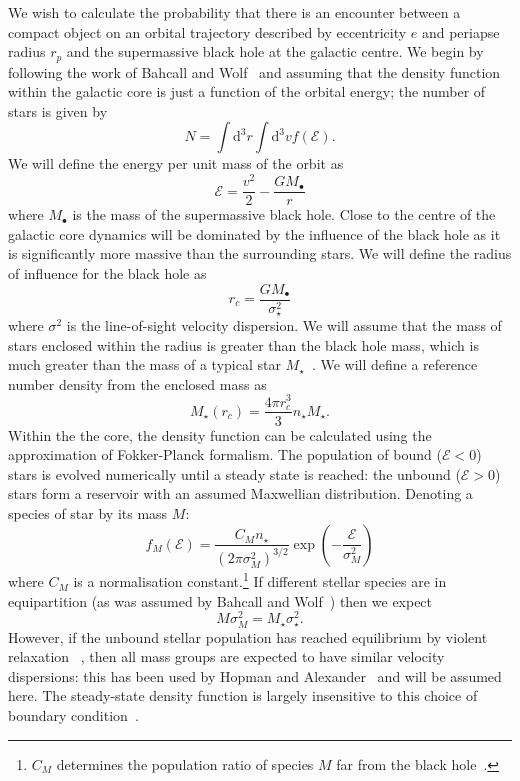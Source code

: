 \documentclass[useAMS,usenatbib]{mn2e}
\newcommand{\dd}{\ensuremath{\mathrm{d}}}
\begin{document}
We wish to calculate the probability that there is an encounter between a compact object on an orbital trajectory described by eccentricity $e$ and periapse radius $r_p$ and the supermassive black hole at the galactic centre. We begin by following the work of Bahcall and Wolf~\cite{Bahcall1976, Bahcall1977} and assuming that the density function within the galactic core is just a function of the orbital energy; the number of stars is given by
\begin{equation}
N = \int \dd^3r \int \dd^3v f(\mathcal{E}).
\end{equation}
We will define the energy per unit mass of the orbit as
\begin{equation}
\mathcal{E} = \frac{v^2}{2} - \frac{GM_\bullet}{r}
\end{equation}
where $M_\bullet$ is the mass of the supermassive black hole. Close to the centre of the galactic core dynamics will be dominated by the influence of the black hole as it is significantly more massive than the surrounding stars. We will define the radius of influence for the black hole as
\begin{equation}
r_c = \frac{GM_\bullet}{\sigma_\star^2}
\end{equation}
where $\sigma^2$ is the line-of-sight velocity dispersion. We will assume that the mass of stars enclosed within the radius is greater than the black hole mass, which is much greater than the mass of a typical star $M_\star$~\cite{Bahcall1976}. We will define a reference number density from the enclosed mass as
\begin{equation}
M_\star(r_c) = \frac{4\pi r_c^3}{3}n_\star M_\star.
\end{equation}
Within the the core, the density function can be calculated using the approximation of Fokker-Planck formalism. The population of bound ($\mathcal{E} < 0$) stars is evolved numerically until a steady state is reached: the unbound ($\mathcal{E} > 0$) stars form a reservoir with an assumed Maxwellian distribution. Denoting a species of star by its mass $M$:
\begin{equation}
f_M(\mathcal{E}) = \frac{C_M n_\star}{(2\pi\sigma_M^2)^{3/2}} \exp\left(-\frac{\mathcal{E}}{\sigma_M^2}\right)
\end{equation}
where $C_M$ is a normalisation constant.\footnote{$C_M$ determines the population ratio of species $M$ far from the black hole~\cite{Alexander2009}.} If different stellar species are in equipartition (as was assumed by Bahcall and Wolf~\cite{Bahcall1976, Bahcall1977}) then we expect
\begin{equation}
M \sigma_M^2 = M_\star \sigma_\star^2.
\end{equation}
However, if the unbound stellar population has reached equilibrium by violent relaxation ~\cite{Lynden-Bell1967}, then all mass groups are expected to have similar velocity dispersions: this has been used by Hopman and Alexander~\cite{Alexander2009, O'Leary2009} and will be assumed here. The steady-state density function is largely insensitive to this choice of boundary condition~\cite{Bahcall1977, Alexander2009}.
\end{document}
